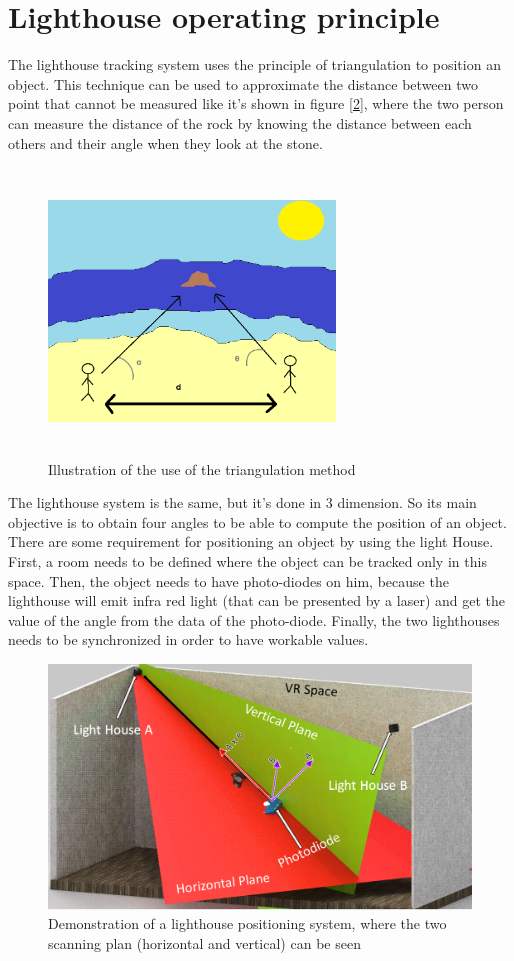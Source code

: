 \documentclass{vldb}
\begin{document}
\section{Lighthouse operating principle}
The lighthouse tracking system uses the principle of triangulation to position an object. This technique can be used to approximate the distance between two point that cannot be measured like it's shown in figure [\ref{plage}], where the two person can measure the distance of the rock by knowing the distance between each others and their angle when they look at the stone.
\begin{figure}
\centering
\includegraphics[width=3in,height=3in]{Image/plage.png}
\caption{Illustration of the use of the triangulation method}
\label{plage}
\end{figure}
The lighthouse system is the same, but it's done in 3 dimension. So its main objective is to obtain four angles to be able to compute the position of an object. 
There are some requirement for positioning an object by using the light House. First, a room needs to be defined where the object can be tracked only in this space. Then, the object needs to have photo-diodes on him, because the lighthouse will emit infra red light (that can be presented by a laser) and get the value of the angle from the data of the photo-diode. Finally, the two lighthouses needs to be synchronized in order to have workable values.
\bigbreak
\begin{figure}
\centering
\includegraphics[width=1.0\columnwidth]{Image/LH1.png}
\caption{Demonstration of a lighthouse positioning system, where the two scanning plan (horizontal and vertical) can be seen}
\label{plage}
\end{figure}
\end{document}

